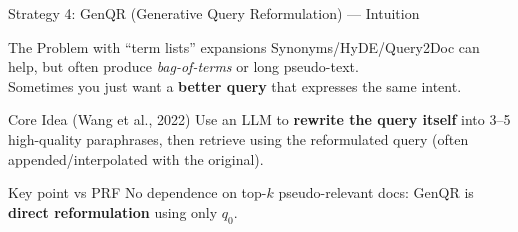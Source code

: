 \documentclass[aspectratio=169]{beamer}
\begin{document}
\begin{frame}[shrink=20]{Strategy 4: GenQR (Generative Query Reformulation) --- Intuition}
\begin{exampleblock}{The Problem with ``term lists'' expansions}
Synonyms/HyDE/Query2Doc can help, but often produce \emph{bag-of-terms} or long pseudo-text.\\
Sometimes you just want a \textbf{better query} that expresses the same intent.
\end{exampleblock}

\vspace{0.5em}

\begin{block}{Core Idea (Wang et al., 2022)}
Use an LLM to \textbf{rewrite the query itself} into 3--5 high-quality paraphrases, then retrieve using the reformulated query (often appended/interpolated with the original).
\end{block}

\vspace{0.8em}

\begin{center}
\end{center}

\vspace{0.3em}
\begin{alertblock}{Key point vs PRF}
No dependence on top-$k$ pseudo-relevant docs: GenQR is \textbf{direct reformulation} using only $q_0$.
\end{alertblock}
\end{frame}
\end{document}
